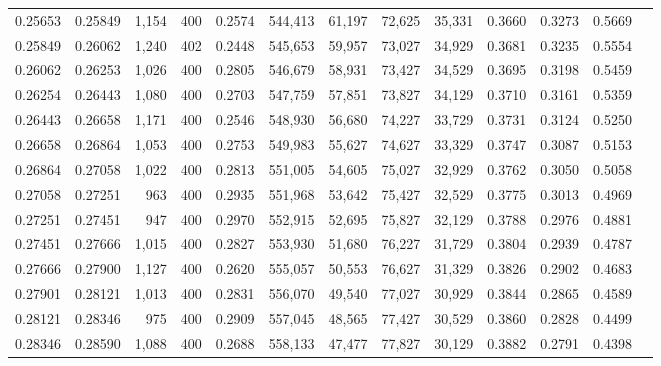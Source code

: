 \begin{tabular}{rrrrrrrrrrrrr}
0.25653 & 0.25849 &  1,154 & 400 &                                     0.2574 & 544,413 &  61,197 &  72,625 &  35,331 & 0.3660 & 0.3273 & 0.5669 \\
0.25849 & 0.26062 &  1,240 & 402 &                                     0.2448 & 545,653 &  59,957 &  73,027 &  34,929 & 0.3681 & 0.3235 & 0.5554 \\
0.26062 & 0.26253 &  1,026 & 400 &                                     0.2805 & 546,679 &  58,931 &  73,427 &  34,529 & 0.3695 & 0.3198 & 0.5459 \\
0.26254 & 0.26443 &  1,080 & 400 &                                     0.2703 & 547,759 &  57,851 &  73,827 &  34,129 & 0.3710 & 0.3161 & 0.5359 \\
0.26443 & 0.26658 &  1,171 & 400 &                                     0.2546 & 548,930 &  56,680 &  74,227 &  33,729 & 0.3731 & 0.3124 & 0.5250 \\
0.26658 & 0.26864 &  1,053 & 400 &                                     0.2753 & 549,983 &  55,627 &  74,627 &  33,329 & 0.3747 & 0.3087 & 0.5153 \\
0.26864 & 0.27058 &  1,022 & 400 &                                     0.2813 & 551,005 &  54,605 &  75,027 &  32,929 & 0.3762 & 0.3050 & 0.5058 \\
0.27058 & 0.27251 &    963 & 400 &                                     0.2935 & 551,968 &  53,642 &  75,427 &  32,529 & 0.3775 & 0.3013 & 0.4969 \\
0.27251 & 0.27451 &    947 & 400 &                                     0.2970 & 552,915 &  52,695 &  75,827 &  32,129 & 0.3788 & 0.2976 & 0.4881 \\
0.27451 & 0.27666 &  1,015 & 400 &                                     0.2827 & 553,930 &  51,680 &  76,227 &  31,729 & 0.3804 & 0.2939 & 0.4787 \\
0.27666 & 0.27900 &  1,127 & 400 &                                     0.2620 & 555,057 &  50,553 &  76,627 &  31,329 & 0.3826 & 0.2902 & 0.4683 \\
0.27901 & 0.28121 &  1,013 & 400 &                                     0.2831 & 556,070 &  49,540 &  77,027 &  30,929 & 0.3844 & 0.2865 & 0.4589 \\
0.28121 & 0.28346 &    975 & 400 &                                     0.2909 & 557,045 &  48,565 &  77,427 &  30,529 & 0.3860 & 0.2828 & 0.4499 \\
0.28346 & 0.28590 &  1,088 & 400 &                                     0.2688 & 558,133 &  47,477 &  77,827 &  30,129 & 0.3882 & 0.2791 & 0.4398 \\

\end{tabular}

